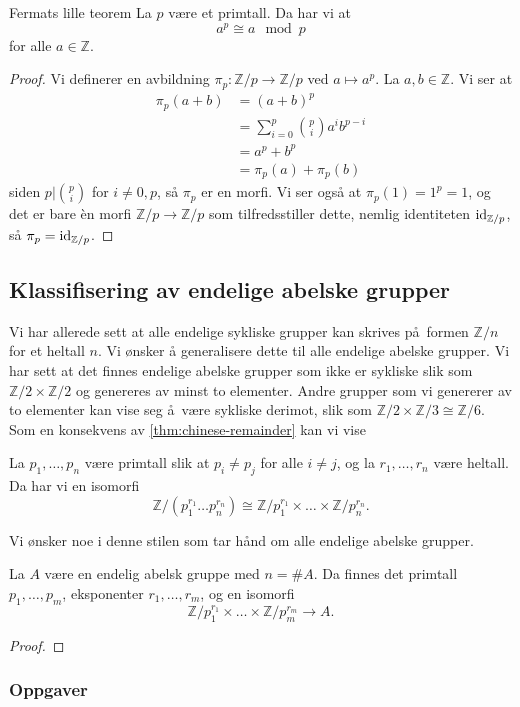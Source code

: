 \begin{corollary}{Fermats lille teorem}
    La $p$ være et primtall.
    Da har vi at
    \[
        a^p \cong a \mod p
    \]
    for alle $a\in \mathbb Z$.
\end{corollary}
\begin{proof}
    Vi definerer en avbildning $\pi_p\colon \mathbb Z / p\to\mathbb Z / p$
    ved $a\mapsto a^p$.
    La $a,b\in \mathbb Z$.
    Vi ser at
    \[\begin{aligned}
        \pi_p(a + b)
        &= (a + b)^p
        \\
        &= \sum_{i = 0}^p \binom p i a^i b^{p - i}
        \\
        &= a^p + b^p
        \\
        &= \pi_p(a) + \pi_p(b)
    \end{aligned}\]
    siden $p|\binom p i$ for $i\neq 0, p$,
    så $\pi_p$ er en morfi.
    Vi ser også at $\pi_p(1) = 1^p = 1$,
    og det er bare \`en morfi $\mathbb Z / p\to \mathbb Z / p$
    som tilfredsstiller dette, nemlig identiteten $\operatorname{id}_{\mathbb Z / p}$,
    så $\pi_p = \operatorname{id}_{\mathbb Z / p}$.
\end{proof}

\subsection{Klassifisering av endelige abelske grupper}
Vi har allerede sett at alle endelige sykliske grupper kan skrives på formen
$\mathbb Z / n$ for et heltall $n$.
Vi ønsker å generalisere dette til alle endelige abelske grupper.
Vi har sett at det finnes endelige abelske grupper som ikke er sykliske
slik som $\mathbb Z / 2\times \mathbb Z / 2$ og genereres av minst to elementer.
Andre grupper som vi genererer av to elementer kan vise seg å være sykliske derimot,
slik som $\mathbb Z / 2\times \mathbb Z / 3 \cong \mathbb Z / 6$.
Som en konsekvens av \cref{thm:chinese-remainder} kan vi vise
\begin{corollary}
    La $p_1,\dots,p_n$ være primtall slik at $p_i \neq p_j$
    for alle $i\neq j$,
    og la $r_1,\dots,r_n$ være heltall.
    Da har vi en isomorfi
    \[
        \mathbb Z / (p_1^{r_1}\dots p_n^{r_n})
        \cong
        \mathbb Z / p_1^{r_1}\times\dots\times\mathbb Z / p_n^{r_n}.
    \]
\end{corollary}

Vi ønsker noe i denne stilen som tar hånd om alle endelige abelske grupper.
\begin{theorem}
    La $A$ være en endelig abelsk gruppe med $n = \# A$.
    Da finnes det primtall $p_1,\dots, p_m$,
    eksponenter $r_1,\dots,r_m$,
    og en isomorfi
    \[
        \mathbb Z / p_1^{r_1} \times \dots \times\mathbb Z / p_m^{r_m}
        \to A.
    \]
\end{theorem}
\begin{proof}
\end{proof}

\subsubsection*{Oppgaver}
